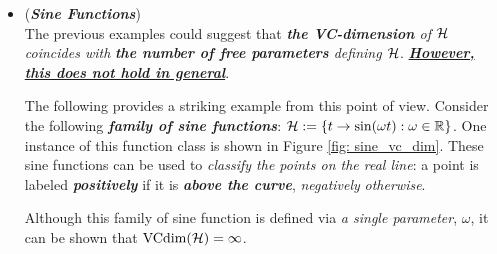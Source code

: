 \documentclass[11pt]{article}
\begin{document}
\begin{itemize}
\item \begin{example}(\textbf{\emph{Sine Functions}})\\
The previous examples could suggest that \emph{\textbf{the VC-dimension} of ${\mathcal H}$ coincides with} \emph{\textbf{the number of free parameters} defining ${\mathcal H}$}.  \underline{\emph{\textbf{However, this does not hold in general}}}. 

The following provides a striking example from this point of view. Consider the following \emph{\textbf{family of sine functions}}: ${\mathcal H} := \left\{t\to \sin(\omega t): \omega \in {\mathbb R}\right\}$.  One instance of this function class is shown in Figure \ref{fig: sine_vc_dim}. These sine functions can be used to \emph{classify the points on the real line}: a point is labeled \emph{\textbf{positively}} if it is \emph{\textbf{above the curve}}, \emph{negatively} \emph{otherwise}. 

Although this family of sine function is defined via \emph{a single parameter}, $\omega$, it can be shown that \underline{$\text{VCdim}({\mathcal H}) = \infty$}.
\end{example}
\end{itemize}
\end{document}
